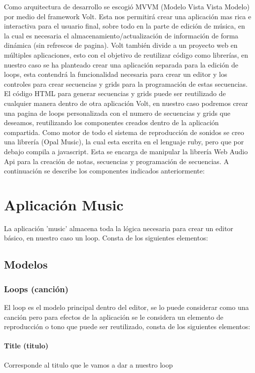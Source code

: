 Como arquitectura de desarrollo se escogió MVVM (Modelo Vista Vista Modelo) por
medio del framework Volt.
Esta nos permitirá crear una aplicación mas rica e interactiva para
el usuario final, sobre todo en la parte de edición de música, en la cual
es necesaria el almacenamiento/actualización de información de forma
dinámica (sin refrescos de pagina).
Volt también divide a un proyecto web en múltiples aplicaciones, esto con
el objetivo de reutilizar código como librerías, en nuestro caso se ha
planteado crear una aplicación separada para la edición de loops, esta
contendrá la funcionalidad necesaria para crear un editor y los controles para
crear secuencias y grids para la programación de estas secuencias. El código
HTML para generar secuencias y grids puede ser reutilizado de cualquier manera
dentro de otra aplicación Volt, en nuestro caso podremos crear una pagina de loops
personalizada con el numero de secuencias y grids que deseamos, reutilizando los
componentes creados dentro de la aplicación compartida.
Como motor de todo el sistema de reproducción de sonidos se creo una librería
(Opal Music), la cual esta escrita en el lenguaje ruby, pero que por debajo
compila a javascript. Esta se encarga de manipular la librería Web Audio
Api para la creación de notas, secuencias y programación de secuencias.
A continuación se describe los componentes indicados anteriormente:

\section{Aplicación Music}

La aplicación 'music' almacena toda la lógica necesaria para crear
un editor básico, en nuestro caso un loop. Consta de los siguientes elementos:

\subsection{Modelos}
\subsubsection{Loops (canción)}
El loop es el modelo principal dentro del editor, se lo puede considerar como
una canción pero para efectos de la aplicación se le considera un elemento de
reproducción o tono que puede ser reutilizado, consta de los siguientes elementos:
\paragraph{Title (titulo)}
Corresponde al titulo que le vamos a dar a nuestro loop
